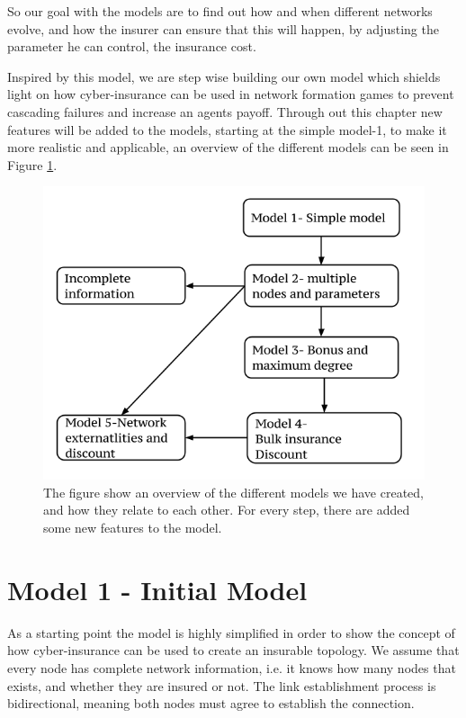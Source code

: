 So our goal with the models are to find out how and when different networks evolve, and how the insurer can ensure that this will happen, by adjusting the parameter he can control, the insurance cost. 

Inspired by this model, we are step wise building our own model which shields light on how cyber-insurance can be used in network formation games to prevent cascading failures and increase an agents payoff.  
Through out this chapter new features will be added to the models, starting at the simple model-1, to make it more realistic and applicable, an overview of the different models can be seen in Figure \ref{fig:Overview-of-models}.

\begin{figure}[h]
\centering
  \includegraphics[width=0.9\linewidth]{../Figures/modeloverview.png}
  \caption{\label{fig:Overview-of-models} The figure show an overview of the different models we have created, and how they relate to each other. For every step, there are added some new features to the model.}

\end{figure}

\section{Model 1 - Initial Model \label{section:verysimplemodel}}

As a starting point the model is highly simplified in order to show the concept of how cyber-insurance can be used to create an insurable topology. We assume that every node has complete network information, i.e. it knows how many nodes that exists, and whether they are insured or not. The link establishment process is bidirectional, meaning both nodes must agree to establish the connection.

